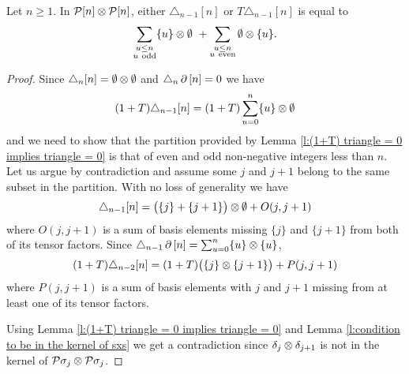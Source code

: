 \begin{lemma}
	Let $n \geq 1$.
	In $\mathcal{P}[n] \otimes \mathcal{P}[n]$, either $\triangle_{n-1} [n]$ or $T \triangle_{n-1} [n]$ is equal to
	\[
	\sum_{\substack{u \leq n \\ u \ \mathrm{odd}}} \{u\} \ot \emptyset \ +
	\sum_{\substack{u \leq n \\ u \ \mathrm{even}}} \emptyset \ot \{u\}.
	\]
\end{lemma}

\begin{proof}
	Since $\triangle_{n} [n] = \emptyset \otimes \emptyset$ and $\triangle_{n} \operatorname{\partial} \, [n] = 0$ we have
	\[
	(1+T) \triangle_{n-1} [n] = (1+T) \sum_{u=0}^n \{u\} \otimes \emptyset
	\]
	and we need to show that the partition provided by Lemma \ref{l:(1+T) triangle = 0 implies triangle = 0} is that of even and odd non-negative integers less than $n$.
	Let us argue by contradiction and assume some $j$ and $j+1$ belong to the same subset in the partition.
	With no loss of generality we have
	\[
	\triangle_{n-1} [n] = \big( \{j\} + \{j+1\} \big) \otimes \emptyset + O(j, j+1)
	\]
	where $O(j, j+1)$ is a sum of basis elements missing $\{j\}$ and $\{j+1\}$ from both of its tensor factors.
	Since $\triangle_{n-1} \operatorname{\partial} \, [n] = \sum_{u=0}^{n} \{u\} \otimes \{u\}$,
	\[
	(1+T) \triangle_{n-2} [n] = (1+T) \big( \{j\} \otimes \{j+1\} \big) + P(j, j+1)
	\]
	where $P(j, j+1)$ is a sum of basis elements with $j$ and $j+1$ missing from at least one of its tensor factors.

	Using Lemma \ref{l:(1+T) triangle = 0 implies triangle = 0} and Lemma \ref{l:condition to be in the kernel of sxs} we get a contradiction since $\delta_j \otimes \delta_{j+1}$ is not in the kernel of $\mathcal{P} \sigma_j \otimes \mathcal{P} \sigma_j$.
\end{proof}